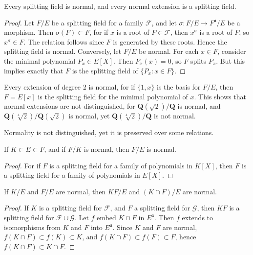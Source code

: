 \begin{corollary}
    Every splitting field is normal, and every normal extension is a splitting field.
\end{corollary}
\begin{proof}
    Let $F/E$ be a splitting field for a family $\mathcal{F}$, and let $\sigma: F/E \to F^{\mathfrak{a}}/E$ be a morphism. Then $\sigma(F) \subset F$, for if $x$ is a root of $P \in \mathcal{F}$, then $x^\sigma$ is a root of $P$, so $x^\sigma \in F$. The relation follows since $F$ is generated by these roots. Hence the splitting field is normal. Conversely, let $F/E$ be normal. For each $x \in F$, consider the minimal polynomial $P_x \in E[X]$. Then $P_x(x) = 0$, so $F$ splits $P_x$. But this implies exactly that $F$ is the splitting field of $\{ P_x : x \in F \}$.
\end{proof}

\begin{example}
    Every extension of degree 2 is normal, for if $\{ 1, x \}$ is the basis for $F/E$, then $F = E[x]$ is the splitting field for the minimal polynomial of $x$. This shows that normal extensions are not distinguished, for $\mathbf{Q}(\sqrt{2})/\mathbf{Q}$ is normal, and $\mathbf{Q}(\sqrt[4]{2})/\mathbf{Q}(\sqrt{2})$ is normal, yet $\mathbf{Q}(\sqrt[4]{2})/\mathbf{Q}$ is not normal.
\end{example}

Normality is not distinguished, yet it is preserved over some relations.

\begin{theorem}
    If $K \subset E \subset F$, and if $F/K$ is normal, then $F/E$ is normal.
\end{theorem}
\begin{proof}
    For if $F$ is a splitting field for a family of polynomials in $K[X]$, then $F$ is a splitting field for a family of polynomials in $E[X]$.
\end{proof}

\begin{theorem}
    If $K/E$ and $F/E$ are normal, then $KF/E$ and $(K \cap F)/ E$ are normal.
\end{theorem}
\begin{proof}
    If $K$ is a splitting field for $\mathcal{F}$, and $F$ a splitting field for $\mathcal{G}$, then $KF$ is a splitting field for $\mathcal{F} \cup \mathcal{G}$. Let $f$ embed $K \cap F$ in $E^{\mathfrak{a}}$. Then $f$ extends to isomorphisms from $K$ and $F$ into $E^{\mathfrak{a}}$. Since $K$ and $F$ are normal, $f(K \cap F) \subset f(K) \subset K$, and $f(K \cap F) \subset f(F) \subset F$, hence $f(K \cap F) \subset K \cap F$.
\end{proof}

